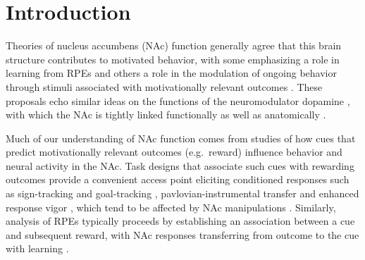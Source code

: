 \documentclass[11pt]{article}
\let\cite=\citep
\begin{document}
\newpage

\section*{Introduction}

Theories of nucleus accumbens (NAc) function generally agree that this
brain structure contributes to motivated behavior, with some
emphasizing a role in learning from RPEs
\cite{Averbeck2017,Joel2002,Khamassi2012,Lee2012,Maia2009,Schultz2016}\cite[see
  also the addiction literature on effects of drug
  rewards;][]{Carelli2009,Hyman2006,Kalivas2005} and others a role in
the modulation of ongoing behavior through stimuli associated with
motivationally relevant outcomes \cite[invigorating,
  directing;][]{Floresco2015,Nicola2010a,Salamone2012}. These
proposals echo similar ideas on the functions of the neuromodulator
dopamine \cite{Berridge2012,Maia2009,Salamone2012,Schultz2016}, with
which the NAc is tightly linked functionally as well as anatomically
\cite{Cheer2007,DuHoffmann2014,Ikemoto2007,Takahashi2016}.

Much of our understanding of NAc function comes from studies of how
cues that predict motivationally relevant outcomes (e.g.\ reward)
influence behavior and neural activity in the NAc. Task designs that
associate such cues with rewarding outcomes provide a convenient
access point eliciting conditioned responses such as sign-tracking and
goal-tracking \cite{hearst1974sign,Robinson2009},
pavlovian-instrumental transfer \cite{Estes1943,Rescorla1967} and
enhanced response vigor \cite{Nicola2010a,Niv2007}, which tend to be
affected by NAc manipulations \cite{Chang2012,Corbit2011,Flagel2011}
\cite[although not always
  straightforwardly;][]{Giertler2004,Chang2013}. Similarly, analysis
of RPEs typically proceeds by establishing an association between a
cue and subsequent reward, with NAc responses transferring from
outcome to the cue with learning
\cite{Day2007a,Roitman2005,Setlow2003,Schultz1997}.
\end{document}
